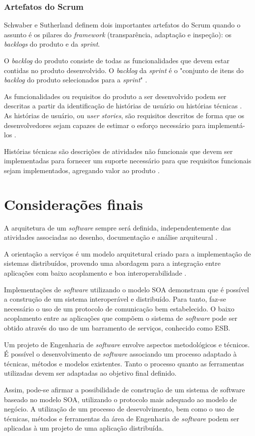 \subsubsection{Artefatos do Scrum}
Schwaber e Sutherland \cite{schwaber_guia_2013} definem dois importantes artefatos do Scrum quando o assunto é os pilares do \textit{framework} (transparência, adaptação e inspeção): os \textit{backlogs} do produto e da \textit{sprint}. 

O \textit{backlog} do produto consiste de todas as funcionalidades que devem estar contidas no produto desenvolvido. O \textit{backlog} da \textit{sprint} é o "conjunto de itens do \textit{backlog} do produto selecionados para a \textit{sprint}" \cite{schwaber_guia_2013}.

As funcionalidades ou requisitos do produto a ser desenvolvido podem ser descritas a partir da identificação de histórias de usuário ou histórias técnicas \cite{galen_technical_2013}. As histórias de usuário, ou \textit{user stories}, são requisitos descritos de forma que os desenvolvedores sejam capazes de estimar o esforço necessário para implementá-los \cite{ambler_user_2005}.

Histórias técnicas são descrições de atividades não funcionais que devem ser implementadas para fornecer um suporte necessário para que requisitos funcionais sejam implementados, agregando valor ao produto \cite{galen_technical_2013}.

\section{Considerações finais}

A arquitetura de um \textit{software} sempre será definida, independentemente das atividades associadas ao desenho, documentação e análise arquiteural \cite{bass_software_archi_practice_2003}.

A orientação a serviços é um modelo arquitetural criado para a implementação de sistemas distribuídos, provendo uma abordagem para a integração entre aplicações com baixo acoplamento e boa interoperabilidade \cite{linthicum_soainrealworld_2007}.

Implementações de \textit{software} utilizando o modelo SOA demonstram que é possível a construção de um sistema interoperável e distribuído. Para tanto, faz-se necessário o uso de um protocolo de comunicação bem estabelecido. O baixo acoplamento entre as aplicações que compõem o sistema de \textit{software} pode ser obtido através do uso de um barramento de serviços, conhecido como ESB.

Um projeto de Engenharia de \textit{software} envolve aspectos metodológicos e técnicos. É possível o desenvolvimento de \textit{software} associando um processo adaptado à técnicas, métodos e modelos existentes. Tanto o processo quanto as ferramentas utilizadas devem ser adaptadas ao objetivo final definido.

Assim, pode-se afirmar a possibilidade de construção de um sistema de software baseado no modelo SOA, utilizando o protocolo mais adequado ao modelo de negócio. A utilização de um processo de desevolvimento, bem como o uso de técnicas, métodos e ferramentas da área de Engenharia de \textit{software} podem ser aplicadas à um projeto de uma aplicação distribuída.